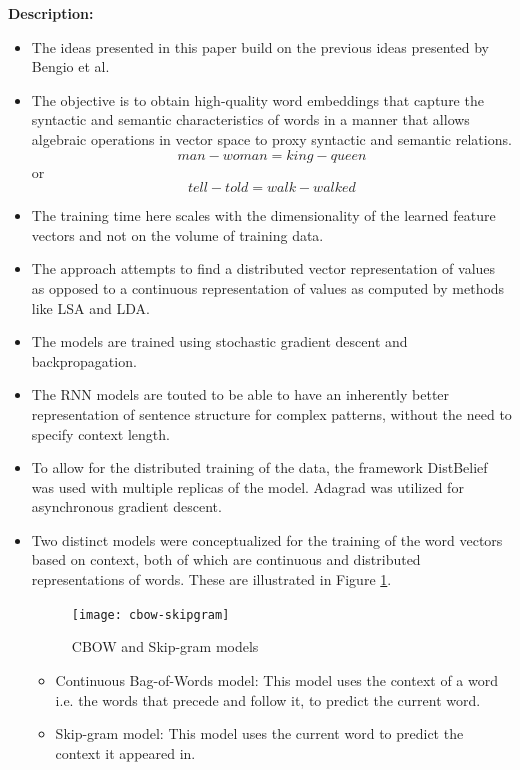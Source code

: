 \documentclass[11pt,a4paper]{article}
\begin{document}
  \textbf{Description:}
  \begin{itemize}
    \item
    The ideas presented in this paper build on the previous ideas presented by Bengio et al.\cite{bengio2003neural}
    \item
    The objective is to obtain high-quality word embeddings that capture the syntactic and semantic characteristics of words in a manner that allows algebraic operations in vector space to proxy syntactic and semantic relations.
    $$man - woman = king - queen$$ or $$tell - told = walk - walked$$
    \item
    The training time here scales with the dimensionality of the learned feature vectors and not on the volume of training data.
    \item
    The approach attempts to find a distributed vector representation of values as opposed to a continuous representation of values as computed by methods like LSA and LDA.
    \item
    The models are trained using stochastic gradient descent and backpropagation.
    \item
    The RNN models are touted to be able to have an inherently better representation of sentence structure for complex patterns, without the need to specify context length.
    \item
    To allow for the distributed training of the data, the framework DistBelief was used with multiple replicas of the model. Adagrad was utilized for asynchronous gradient descent.
    \item
    Two distinct models were conceptualized for the training of the word vectors based on context, both of which are continuous and distributed representations of words. These are illustrated in Figure \ref{fig:cbow-skipgram}.
    \begin{figure}[ht]
      \centering
      \texttt{[image: cbow-skipgram]}
      \caption{CBOW and Skip-gram models}
      \label{fig:cbow-skipgram}
    \end{figure}
    \begin{itemize}
      \item
      Continuous Bag-of-Words model: This model uses the context of a word i.e. the words that precede and follow it, to predict the current word.
      \item
      Skip-gram model: This model uses the current word to predict the context it appeared in.
    \end{itemize}
  \end{itemize}
\end{document}
